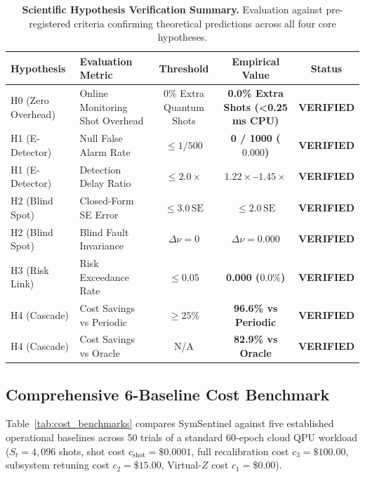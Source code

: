 \documentclass[aps,pra,twocolumn,superscriptaddress,10pt,floatfix]{revtex4-2}
\begin{document}
\begin{table}[h]
\centering
\small
\begin{tabular}{llccc}
\toprule
\textbf{Hypothesis} & \textbf{Evaluation Metric} & \textbf{Threshold} & \textbf{Empirical Value} & \textbf{Status} \\
\midrule
H0 (Zero Overhead) & Online Monitoring Shot Overhead & 0\% Extra Quantum Shots & \textbf{0.0\% Extra Shots (<0.25 ms CPU)} & \textbf{VERIFIED} \\
H1 (E-Detector) & Null False Alarm Rate & $\le 1/500$ & \textbf{0 / 1000 ($0.000$)} & \textbf{VERIFIED} \\
H1 (E-Detector) & Detection Delay Ratio & $\le 2.0\times$ & \textbf{$1.22\times$--$1.45\times$} & \textbf{VERIFIED} \\
H2 (Blind Spot) & Closed-Form SE Error & $\le 3.0\,\text{SE}$ & \textbf{$\le 2.0\,\text{SE}$} & \textbf{VERIFIED} \\
H2 (Blind Spot) & Blind Fault Invariance & $\Delta \nu = 0$ & \textbf{$\Delta \nu = 0.000$} & \textbf{VERIFIED} \\
H3 (Risk Link) & Risk Exceedance Rate & $\le 0.05$ & \textbf{0.000 ($0.0\%$)} & \textbf{VERIFIED} \\
H4 (Cascade) & Cost Savings vs Periodic & $\ge 25\%$ & \textbf{96.6\% vs Periodic} & \textbf{VERIFIED} \\
H4 (Cascade) & Cost Savings vs Oracle & N/A & \textbf{82.9\% vs Oracle} & \textbf{VERIFIED} \\
\bottomrule
\end{tabular}
\caption{\textbf{Scientific Hypothesis Verification Summary.} Evaluation against pre-registered criteria confirming theoretical predictions across all four core hypotheses.}
\label{tab:hypotheses}
\end{table}

\subsection{Comprehensive 6-Baseline Cost Benchmark}
Table~\ref{tab:cost_benchmarks} compares SymSentinel against five established operational baselines across 50 trials of a standard 60-epoch cloud QPU workload ($S_t = 4,096$ shots, shot cost $c_{\mathrm{shot}} = \$0.0001$, full recalibration cost $c_3 = \$100.00$, subsystem retuning cost $c_2 = \$15.00$, Virtual-$Z$ cost $c_1 = \$0.00$).
\end{document}
